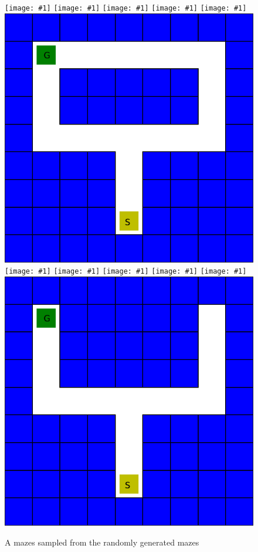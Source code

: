 \begin{figure}[t!]%
\centering%
\def\figw{0.16\columnwidth}%
\newcommand{\includesnapshot}[1]{%
  \texttt{[image: \#1]}}%
\includesnapshot{images/snapshot/00063000-snapshot.png}%
\includesnapshot{images/snapshot/00087000-snapshot.png}%
\includesnapshot{images/snapshot/00156165-snapshot.png}%
\includesnapshot{images/snapshot/00159840-snapshot.png}%
\includesnapshot{images/snapshot/00166605-snapshot.png}%
\includegraphics[width=\figw]{images/dhiman_0002_entityLayer.pdf}\\
\includesnapshot{images/snapshot/00193065-snapshot.png}%
\includesnapshot{images/snapshot/00338220-snapshot.png}%
\includesnapshot{images/snapshot/00344985-snapshot.png}%
\includesnapshot{images/snapshot/00948930-snapshot.png}%
\includesnapshot{images/snapshot/00956325-snapshot.png}%
\includegraphics[width=\figw]{images/dhiman_0003_entityLayer.pdf}\\
\caption{A mazes sampled from the randomly generated mazes}%
\label{fig:environments}
\end{figure}
